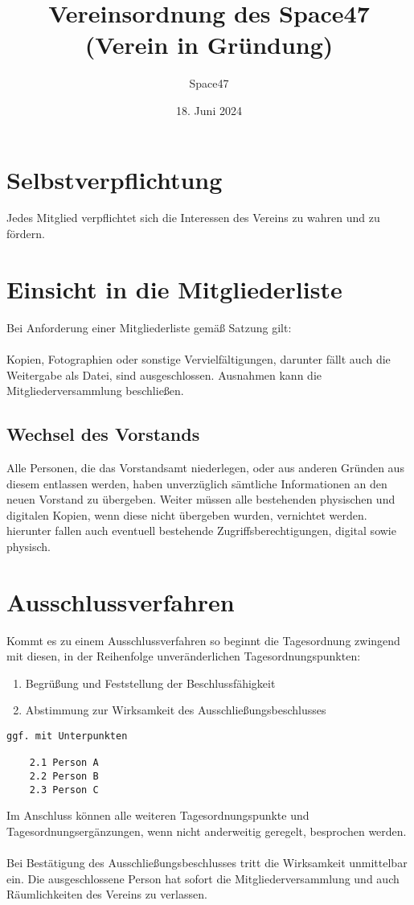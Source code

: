 \documentclass[a4paper]{article}
\title{Vereinsordnung des Space47 (Verein in Gründung)}
\author{Space47}
\date{18. Juni 2024}
\begin{document}
\maketitle

\section{Selbstverpflichtung}
Jedes Mitglied verpflichtet sich die Interessen des Vereins zu wahren und zu fördern.

\section{Einsicht in die Mitgliederliste}
Bei Anforderung einer Mitgliederliste gemäß Satzung gilt: \\ \\
Kopien, Fotographien oder sonstige Vervielfältigungen, darunter fällt auch die Weitergabe als Datei, sind ausgeschlossen. Ausnahmen kann die Mitgliederversammlung beschließen.

\subsection{Wechsel des Vorstands}
Alle Personen, die das Vorstandsamt niederlegen, oder aus anderen Gründen aus diesem entlassen werden, haben unverzüglich sämtliche Informationen an den neuen Vorstand zu übergeben. Weiter müssen alle bestehenden physischen und digitalen Kopien, wenn diese nicht übergeben wurden, vernichtet werden. hierunter fallen auch eventuell bestehende Zugriffsberechtigungen, digital sowie physisch.

\pagebreak

\section{Ausschlussverfahren}
Kommt es zu einem Ausschlussverfahren so beginnt die Tagesordnung zwingend mit diesen, in der Reihenfolge unveränderlichen Tagesordnungspunkten: 
\begin{enumerate}[1.]
    \item Begrüßung und Feststellung der Beschlussfähigkeit
    \item Abstimmung zur Wirksamkeit des Ausschließungsbeschlusses
\end{enumerate}
\begin{verbatim}
ggf. mit Unterpunkten  

    2.1 Person A
    2.2 Person B
    2.3 Person C
\end{verbatim}
Im Anschluss können alle weiteren Tagesordnungspunkte und Tagesordnungsergänzungen, wenn nicht anderweitig geregelt, besprochen werden. \\ \\
Bei Bestätigung des Ausschließungsbeschlusses tritt die Wirksamkeit unmittelbar ein. Die ausgeschlossene Person hat sofort die Mitgliederversammlung und auch Räumlichkeiten des Vereins zu verlassen.
\end{document}
